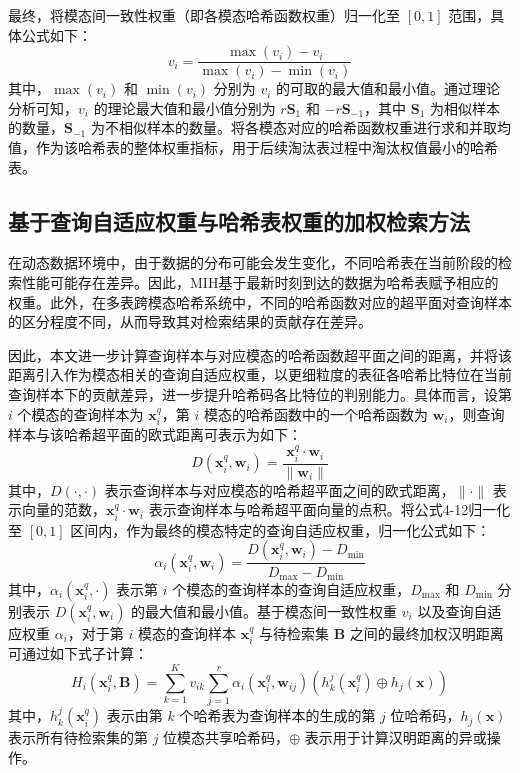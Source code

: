 最终，将模态间一致性权重（即各模态哈希函数权重）归一化至 $[0, 1]$ 范围，具体公式如下：
\begin{equation}
  v_i = \frac{\max(v_i) - v_i}{\max(v_i) - \min(v_i)}
\label{eq:mih-modal-weight-norm}
\end{equation}
其中，$\max(v_i)$ 和 $\min(v_i)$ 分别为 $v_i$ 的可取的最大值和最小值。通过理论分析可知，$v_i$ 的理论最大值和最小值分别为 $r \mathbf{S}_1$ 和 $-r \mathbf{S}_{-1}$，其中 $\mathbf{S}_1$ 为相似样本的数量，$\mathbf{S}_{-1}$ 为不相似样本的数量。将各模态对应的哈希函数权重进行求和并取均值，作为该哈希表的整体权重指标，用于后续淘汰表过程中淘汰权值最小的哈希表。

\subsection{基于查询自适应权重与哈希表权重的加权检索方法}
在动态数据环境中，由于数据的分布可能会发生变化，不同哈希表在当前阶段的检索性能可能存在差异。因此，MIH基于最新时刻到达的数据为哈希表赋予相应的权重。此外，在多表跨模态哈希系统中，不同的哈希函数对应的超平面对查询样本的区分程度不同，从而导致其对检索结果的贡献存在差异。

因此，本文进一步计算查询样本与对应模态的哈希函数超平面之间的距离，并将该距离引入作为模态相关的查询自适应权重，以更细粒度的表征各哈希比特位在当前查询样本下的贡献差异，进一步提升哈希码各比特位的判别能力。具体而言，设第 $i$ 个模态的查询样本为 $\mathbf{x}_i^q$，第 $i$ 模态的哈希函数中的一个哈希函数为 $\mathbf{w}_i$，则查询样本与该哈希超平面的欧式距离可表示为如下：
\begin{equation}
  D(\mathbf{x}_i^q, \mathbf{w}_i) = \frac{\mathbf{x}_i^q \cdot \mathbf{w}_i}{\|\mathbf{w}_i\|}
\label{eq:mih-query-distance}
\end{equation}
其中，$D(\cdot,\cdot)$ 表示查询样本与对应模态的哈希超平面之间的欧式距离，$\|\cdot\|$ 表示向量的范数，$\mathbf{x}_i^q \cdot \mathbf{w}_i$ 表示查询样本与哈希超平面向量的点积。将公式4-12归一化至 $[0, 1]$ 区间内，作为最终的模态特定的查询自适应权重，归一化公式如下：
\begin{equation}
  \alpha_i(\mathbf{x}_i^q, \mathbf{w}_i) = \frac{D(\mathbf{x}_i^q, \mathbf{w}_i) - D_{\min}}{D_{\max} - D_{\min}}
\label{eq:mih-query-weight}
\end{equation}
其中，$\alpha_i(\mathbf{x}_i^q, \cdot)$ 表示第 $i$ 个模态的查询样本的查询自适应权重，$D_{\max}$ 和 $D_{\min}$ 分别表示 $D(\mathbf{x}_i^q, \mathbf{w}_i)$ 的最大值和最小值。基于模态间一致性权重 $v_i$ 以及查询自适应权重 $\alpha_i$，对于第 $i$ 模态的查询样本 $\mathbf{x}_i^q$ 与待检索集 $\mathbf{B}$ 之间的最终加权汉明距离可通过如下式子计算：
\begin{equation}
  H_i(\mathbf{x}_i^q, \mathbf{B}) = \sum_{k=1}^{K} v_{ik} \sum_{j=1}^{r} \alpha_i(\mathbf{x}_i^q, \mathbf{w}_{ij}) \left( h_k^j(\mathbf{x}_i^q) \oplus h_j(\mathbf{x}) \right)
\label{eq:mih-weighted-hamming}
\end{equation}
其中，$h_k^j(\mathbf{x}_i^q)$ 表示由第 $k$ 个哈希表为查询样本的生成的第 $j$ 位哈希码，$h_j(\mathbf{x})$ 表示所有待检索集的第 $j$ 位模态共享哈希码，$\oplus$ 表示用于计算汉明距离的异或操作。

